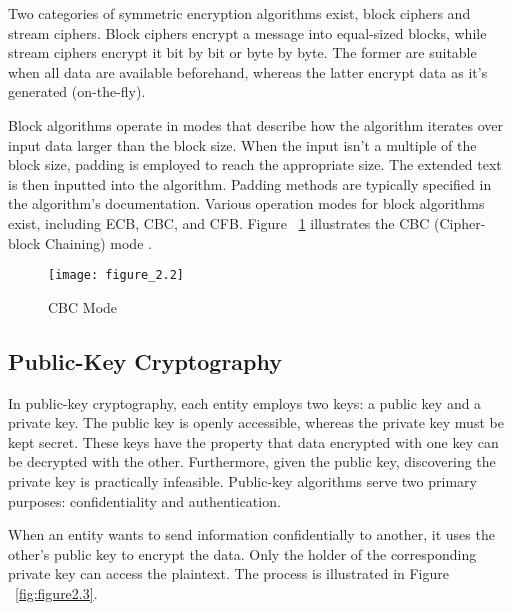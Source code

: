 
Two categories of symmetric encryption algorithms exist, block ciphers and stream ciphers. Block ciphers encrypt a message into equal-sized blocks, while stream ciphers encrypt it bit by bit or byte by byte. The former are suitable when all data are available beforehand, whereas the latter encrypt data as it's generated (on-the-fly).

Block algorithms operate in modes that describe how the algorithm iterates over input data larger than the block size. When the input isn't a multiple of the block size, padding is employed to reach the appropriate size. The extended text is then inputted into the algorithm. Padding methods are typically specified in the algorithm's documentation. Various operation modes for block algorithms exist, including ECB, CBC, and CFB. Figure ~\ref{fig:figure2.2} illustrates the CBC (Cipher-block Chaining) mode \cite{rfc3602}.

\begin{figure}[h!]
\centering
\texttt{[image: figure\_2.2]}\\
\caption{CBC Mode}
\label{fig:figure2.2}
\end{figure}

\newpage
\subsection{Public-Key Cryptography}
In public-key cryptography, each entity employs two keys: a public key and a private key. The public key is openly accessible, whereas the private key must be kept secret. These keys have the property that data encrypted with one key can be decrypted with the other. Furthermore, given the public key, discovering the private key is practically infeasible. Public-key algorithms serve two primary purposes: confidentiality and authentication.

When an entity wants to send information confidentially to another, it uses the other's public key to encrypt the data. Only the holder of the corresponding private key can access the plaintext. The process is illustrated in Figure ~\ref{fig:figure2.3}.

